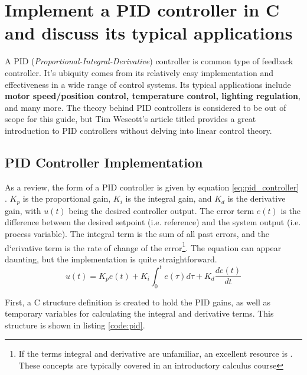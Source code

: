 \documentclass[main.tex]{subfiles}
\begin{document}
\section{Implement a PID controller in C and discuss its typical applications}

\spoilerline

\noindent A PID (\textit{Proportional-Integral-Derivative}) controller is common type of feedback controller. It's ubiquity comes from its relatively easy implementation and effectiveness in a wide range of control systems. Its typical applications include \textbf{motor speed/position control, temperature control, lighting regulation}, and many more. The theory behind PID controllers is considered to be out of scope for this guide, but Tim Wescott's article titled  provides a great introduction to PID controllers without delving into linear control theory.

\subsection{PID Controller Implementation}
As a review, the form of a PID controller is given by equation \eqref{eq:pid_controller} \cite{AbramovitchPID}. $K_p$ is the proportional gain, $K_i$ is the integral gain, and $K_d$ is the derivative gain, with $u(t)$ being the desired controller output. The error term $e(t)$ is the difference between the desired setpoint (i.e. reference) and the system output (i.e. process variable). The integral term is the sum of all past errors, and the d`erivative term is the rate of change of the error\footnote{If the terms integral and derivative are unfamiliar, an excellent resource is . These concepts are typically covered in an introductory calculus course}. The equation can appear daunting, but the implementation is quite straightforward.
\begin{equation}
    u(t) = K_p e(t) + K_i \int_{0}^{t} e(\tau) d\tau + K_d \frac{de(t)}{dt}
    \label{eq:pid_controller}
\end{equation}

\noindent First, a C structure definition is created to hold the PID gains, as well as temporary variables for calculating the integral and derivative terms. This structure is shown in listing \ref{code:pid}.

\end{document}
